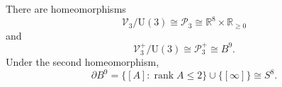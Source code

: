 \begin{theorem}
\label{thm:hr3c-u3-compactification}
There are homeomorphisms
\begin{equation}
 \mathscr V_3/\mathrm U(3)
 \cong\mathcal P_3
 \cong\mathbb R^8\times\mathbb R_{\geq0}
 \label{eq:hr3c-u3-half-space}
\end{equation}
and
\begin{equation}
 \mathscr V_3^+/\mathrm U(3)
 \cong
 \mathcal P_3^+
 \cong B^9.
 \label{eq:hr3c-u3-ball-nine}
\end{equation}
Under the second homeomorphism,
\begin{equation}
 \partial B^9
 =
 \{[A]:\operatorname{rank}A\leq2\}
 \cup\{[\infty]\}
 \cong S^8.
 \label{eq:hr3c-u3-boundary-s8}
\end{equation}
\end{theorem}

